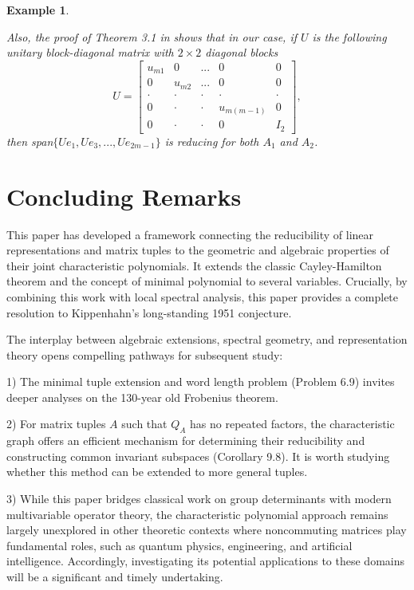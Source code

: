 \documentclass[draft, 12pt, reqno]{amsart}
\numberwithin{equation}{section}
\theoremstyle{plain}
\newtheorem{example}[theorem]{Example}
\begin{document}
\begin{example}
\begin{itemize}
 Also, the proof of Theorem 3.1 in \cite{S2} shows that in our case, if $U$ is the following unitary  block-diagonal matrix with $2\times 2$ diagonal blocks
$$ U=\left [ \begin{array}{ccccc} u_{m1}&0 &...& 0&0\\ 0 & u_{m2}& ...& 0&0\\ \cdot & \cdot & \cdot & \cdot &\cdot \\ 0&\cdot &\cdot & u_{m (m-1)} &0\\ 0& \cdot &\cdot& 0 & I_2\end{array} \right ],$$
then span$\{Ue_1, Ue_3,...,Ue_{2m-1}\}$ is reducing for both $A_1$ and $A_2$.
\end{itemize}
\end{example}
\vspace{.2cm}



\section{Concluding Remarks}\label{concluding}

This paper has developed a framework connecting the reducibility of linear representations and matrix tuples to the geometric and algebraic properties of their joint characteristic polynomials.
It extends the classic Cayley-Hamilton theorem and the concept of minimal polynomial to several variables. Crucially, by combining this work with local spectral analysis, this paper provides a complete resolution to Kippenhahn's long-standing 1951 conjecture.

The interplay between algebraic extensions, spectral geometry, and representation theory opens compelling pathways for subsequent study: 

1) The minimal tuple extension and word length problem (Problem 6.9) invites deeper analyses on the 130-year old Frobenius theorem.

2) For matrix tuples $A$ such that $Q_A$ has no repeated factors, the characteristic graph offers an efficient mechanism for determining their reducibility and constructing common invariant subspaces (Corollary 9.8). It is worth studying whether this method can be extended to more general tuples.

3) While this paper bridges classical work on group determinants with modern multivariable operator theory, the characteristic polynomial approach remains largely unexplored in other theoretic contexts where noncommuting matrices play fundamental roles, such as quantum physics, engineering, and artificial intelligence. Accordingly, investigating its potential applications to these domains will be a significant and timely undertaking.
\end{document}
